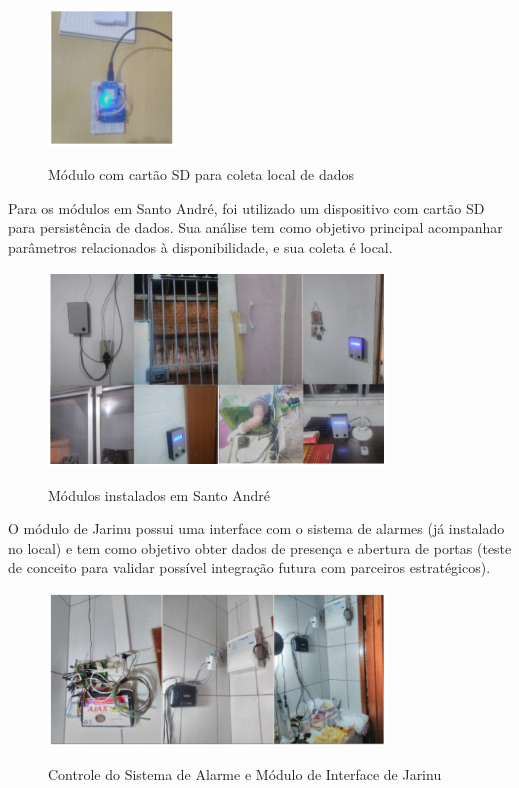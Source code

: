 \begin{figure}[H]
	\centering
	\caption{Módulo com cartão SD para coleta local de dados}
	\includegraphics[width=0.3\textwidth]{SDColetaDados}
	\label{fig:SDColetaDados}
\end{figure}

Para os módulos em Santo André, foi utilizado um dispositivo com cartão SD para persistência de dados. Sua análise tem como objetivo principal acompanhar parâmetros relacionados à disponibilidade, e sua coleta é local.

\begin{figure}[H]
	\centering
	\caption{Módulos instalados em Santo André}
	\includegraphics[width=0.8\textwidth]{ModulosStoAndre}
	\label{fig:ModulosStoAndre}
\end{figure}

O módulo de Jarinu possui uma interface com o sistema de alarmes (já instalado no local) e tem como objetivo obter dados de presença e abertura de portas (teste de conceito para validar possível integração futura com parceiros estratégicos).

\begin{figure}[H]
	\centering
	\caption{Controle do Sistema de Alarme e Módulo de Interface de Jarinu}
	\includegraphics[width=0.8\textwidth]{ModuloSistAlarme}
	\label{fig:ModuloSistAlarme}
\end{figure}

